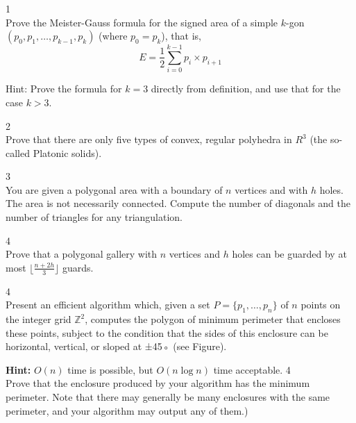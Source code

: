 \documentclass[12pt]{article}
\begin{document}
1\\

    Prove the Meister-Gauss formula for the signed area of a simple $k$-gon $(p_0,p_1,\ldots,p_{k-1},p_k)$ (where $p_0=p_k$), that is,
    \[  E = \frac{1}{2} \sum_{i=0}^{k-1} p_i \times p_{i+1} \]
    
    Hint: Prove the formula for $k=3$ directly from definition, and use that for the case $k>3$.

2\\

    Prove that there are only five types of convex, regular polyhedra in $R^3$ (the so-called Platonic solids).


3\\

    You are given a polygonal area with a boundary of $n$ vertices and with $h$ holes. The area is not necessarily connected. Compute the number of diagonals and the number of triangles for any triangulation.

4\\


    Prove that a  polygonal gallery with $n$ vertices and $h$ holes can be guarded by at most $\lfloor \frac{n+2h}{3} \rfloor$  guards.



4\\
Present an efficient algorithm which, given a set $P = \{p_1 , \ldots , p_n \}$ of $n$
points on the integer grid $\mathbb{Z}^2$, computes the polygon of minimum perimeter that 
encloses these points, subject to the condition that the sides of this enclosure can be horizontal, 
vertical, or sloped at ±45◦ (see Figure). 

\textbf{Hint:} $O(n)$ time is possible, but $O(n \log n)$ time acceptable.
4\\
Prove that the enclosure produced by your algorithm has the minimum perimeter. Note that
there may generally be many enclosures with the same perimeter, and your algorithm may
output any of them.)




    
\end{document}
